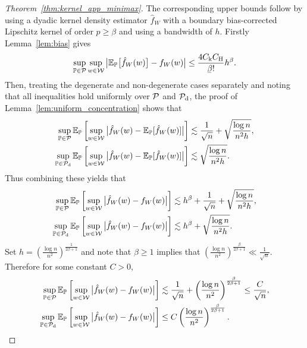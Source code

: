 \begin{proof}[Theorem~\ref{thm:kernel_app_minimax}]

  The corresponding upper bounds follow by
  using a dyadic kernel density estimator $\hat f_W$
  with a boundary bias-corrected
  Lipschitz kernel of order $p \geq \beta$
  and using a bandwidth of $h$.
  Firstly Lemma~\ref{lem:bias} gives
  \begin{align*}
    \sup_{\P \in \cP}
    \sup_{w \in \cW}
    \big|
    \E_\P\big[\hat f_W(w)\big]
    - f_W(w)
    \big|
    \leq
    \frac{4\Ck \CH}{\flbeta !}
    h^\beta.
  \end{align*}
  Then,
  treating the degenerate and non-degenerate cases separately
  and noting that all inequalities hold uniformly over
  $\mathcal{P}$ and $\mathcal{P}_{\mathrm{d}}$,
  the proof of Lemma~\ref{lem:uniform_concentration}
  shows that
  \begin{align*}
    \sup_{\mathbb{P} \in \mathcal{P}}
    \mathbb{E}_{\mathbb{P}}\left[
      \sup_{w \in \mathcal{W}}
      \big|\hat f_W(w) - \mathbb{E}_{\mathbb{P}}[\hat f_W(w)]\big|
    \right]
    &\lesssim
    \frac{1}{\sqrt n}
    + \sqrt{\frac{\log n}{n^2h}}, \\
    \sup_{\mathbb{P} \in \mathcal{P}_{\mathrm{d}}}
    \mathbb{E}_{\mathbb{P}}\left[
      \sup_{w \in \mathcal{W}}
      \big|\hat f_W(w) - \mathbb{E}_{\mathbb{P}}[\hat f_W(w)]\big|
    \right]
    &\lesssim
    \sqrt{\frac{\log n}{n^2h}}.
  \end{align*}
  Thus combining these yields that
  \begin{align*}
    \sup_{\mathbb{P} \in \mathcal{P}}
    \mathbb{E}_{\mathbb{P}}\left[
      \sup_{w \in \mathcal{W}}
      \big|\hat f_W(w) - f_W(w)\big|
    \right]
    &\lesssim
    h^\beta
    + \frac{1}{\sqrt n}
    + \sqrt{\frac{\log n}{n^2h}}, \\
    \sup_{\mathbb{P} \in \mathcal{P}_{\mathrm{d}}}
    \mathbb{E}_{\mathbb{P}}\left[
      \sup_{w \in \mathcal{W}}
      \big|\hat f_W(w) - f_W(w)\big|
    \right]
    &\lesssim
    h^\beta
    + \sqrt{\frac{\log n}{n^2h}}.
  \end{align*}
  Set $h = \left( \frac{\log n}{n^2} \right)^{\frac{1}{2\beta+1}}$
  and note that $\beta \geq 1$ implies that
  $\left(\frac{\log n}{n^2} \right)^{\frac{\beta}{2\beta+1}}
  \ll \frac{1}{\sqrt n}$.
  Therefore for some constant $C > 0$,
  \begin{align*}
    \sup_{\mathbb{P} \in \mathcal{P}}
    \mathbb{E}_{\mathbb{P}}\left[
      \sup_{w \in \mathcal{W}}
      \big|\hat f_W(w) - f_W(w)\big|
    \right]
    &\lesssim
    \frac{1}{\sqrt n}
    + \left(
      \frac{\log n}{n^2}
    \right)^{\frac{\beta}{2\beta+1}}
    \leq
    \frac{C}{\sqrt n}, \\
    \sup_{\mathbb{P} \in \mathcal{P}_{\mathrm{d}}}
    \mathbb{E}_{\mathbb{P}}\left[
      \sup_{w \in \mathcal{W}}
      \big|\hat f_W(w) - f_W(w)\big|
    \right]
    &\leq
    C\left(
      \frac{\log n}{n^2}
    \right)^{\frac{\beta}{2\beta+1}}.
  \end{align*}
\end{proof}

